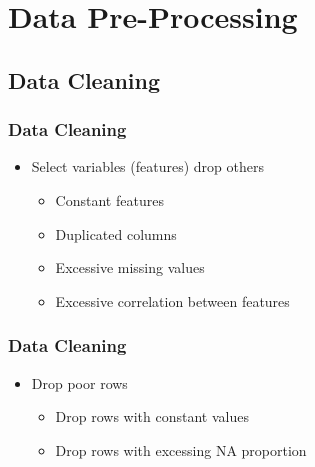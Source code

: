 



\begin{frame}
   \titlepage
\end{frame}



\begin{frame}
   \tableofcontents
\end{frame}



\section{Data Pre-Processing}


\subsection{Data Cleaning}


\begin{frame}\frametitle{Data Cleaning}
   \begin{itemize}
      \item Select variables (features) drop others
      \begin{itemize}
         \item Constant features
         \item Duplicated columns
         \item Excessive missing values
         \item Excessive correlation between features
      \end{itemize}
   \end{itemize}
\end{frame}

\begin{frame}\frametitle{Data Cleaning}
   \begin{itemize}
      \item Drop poor rows
      \begin{itemize}
         \item Drop rows with constant values
         \item Drop rows with excessing NA proportion
      \end{itemize}
   \end{itemize}
\end{frame}


